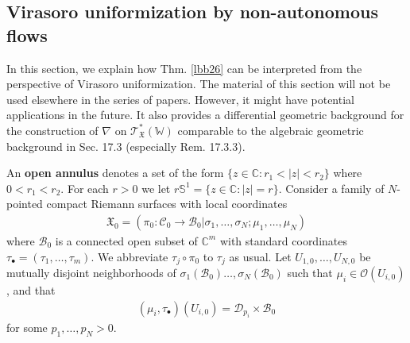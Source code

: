 \documentclass[11pt,b5paper,notitlepage]{article}
\theoremstyle{definition}
\theoremstyle{plain}
\newcommand{\mc}{\mathcal}
\newcommand{\Sbb}{\mathbb{S}}
\newcommand{\scr}{\mathscr}
\newcommand{\blt}{\bullet}
\newcommand{\Wbb}{\mathbb W}
\newcommand{\Cbb}{\mathbb C}
\newcommand{\<}{\left\langle}
\renewcommand{\>}{\right\rangle}
\newcommand{\MC}{\mathcal{C}}
\newcommand{\MB}{\mathcal{B}}
\newcommand{\fx}{\mathfrak{X}}
\numberwithin{equation}{section}
\begin{document}
\subsection{Virasoro uniformization by non-autonomous flows}\label{lbb67}


In this section, we explain how Thm. \ref{lbb26} can be interpreted from the perspective of Virasoro uniformization. The material of this section will not be used elsewhere in the series of papers. However, it might have potential applications in the future. It also provides a differential geometric background for the construction of $\nabla$ on $\scr T_{\fx}^*(\Wbb)$ comparable to the algebraic geometric background in \cite{FB04} Sec. 17.3 (especially Rem. 17.3.3).

An \textbf{open annulus} denotes a set of the form $\{z\in\Cbb:r_1<|z|<r_2\}$ where $0<r_1<r_2$. For each $r>0$ we let $r\Sbb^1=\{z\in\Cbb:|z|=r\}$. Consider a family of $N$-pointed compact Riemann surfaces with local coordinates
\begin{align*}
\fx_0=(\pi_0:\MC_0\rightarrow\MB_0|\sigma_1,\dots,\sigma_N;\mu_1,\dots,\mu_N )
\end{align*}
where $\MB_0$ is a connected open subset of $\Cbb^m$ with standard coordinates $\tau_\blt=(\tau_1,\dots,\tau_m)$. We abbreviate $\tau_j\circ\pi_0$ to $\tau_j$ as usual. Let $U_{1,0},\dots,U_{N,0}$ be mutually disjoint neighborhoods of $\sigma_1(\MB_0)\dots,\sigma_N(\MB_0)$ such that $\mu_i\in\mc O(U_{i,0})$, and that
\begin{align*}
(\mu_i,\tau_\blt)(U_{i,0})=\mc D_{p_i}\times\MB_0
\end{align*}
for some $p_1,\dots,p_N>0$.
\end{document}
